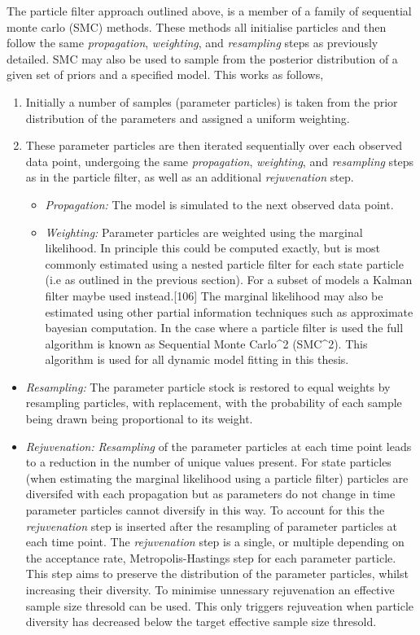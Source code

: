 \documentclass[11pt,twoside]{bristolthesis}
\begin{document}
  The particle filter approach outlined above, is a member of a family of sequential monte carlo (SMC) methods. These methods all initialise particles and then follow the same \emph{propagation}, \emph{weighting}, and \emph{resampling} steps as previously detailed. SMC may also be used to sample from the posterior distribution of a given set of priors and a specified model. This works as follows,
  \begin{enumerate}
  \def\labelenumi{\arabic{enumi}.}
  \item
    Initially a number of samples (parameter particles) is taken from the prior distribution of the parameters and assigned a uniform weighting.
  \item
    These parameter particles are then iterated sequentially over each observed data point, undergoing the same \emph{propagation}, \emph{weighting}, and \emph{resampling} steps as in the particle filter, as well as an additional \emph{rejuvenation} step.
    \begin{itemize}
    \item
      \emph{Propagation:} The model is simulated to the next observed data point.
    \item
      \emph{Weighting:} Parameter particles are weighted using the marginal likelihood. In principle this could be computed exactly, but is most commonly estimated using a nested particle filter for each state particle (i.e as outlined in the previous section). For a subset of models a Kalman filter maybe used instead.{[}106{]} The marginal likelihood may also be estimated using other partial information techniques such as approximate bayesian computation. In the case where a particle filter is used the full algorithm is known as Sequential Monte Carlo\^{}2 (SMC\^{}2). This algorithm is used for all dynamic model fitting in this thesis.
    \end{itemize}
  \end{enumerate}
  \begin{itemize}
  \item
    \emph{Resampling:} The parameter particle stock is restored to equal weights by resampling particles, with replacement, with the probability of each sample being drawn being proportional to its weight.
  \item
    \emph{Rejuvenation:} \emph{Resampling} of the parameter particles at each time point leads to a reduction in the number of unique values present. For state particles (when estimating the marginal likelihood using a particle filter) particles are diversifed with each propagation but as parameters do not change in time parameter particles cannot diversify in this way. To account for this the \emph{rejuvenation} step is inserted after the resampling of parameter particles at each time point. The \emph{rejuvenation} step is a single, or multiple depending on the acceptance rate, Metropolis-Hastings step for each parameter particle. This step aims to preserve the distribution of the parameter particles, whilst increasing their diversity. To minimise unnessary rejuvenation an effective sample size thresold can be used. This only triggers rejuveation when particle diversity has decreased below the target effective sample size thresold.
  \end{itemize}
\end{document}

